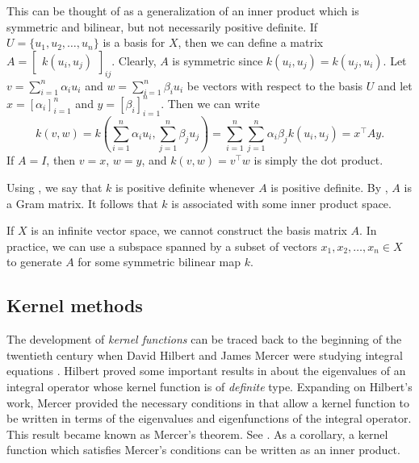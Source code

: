 This can be thought of as a generalization of an inner product which is symmetric and bilinear, but not necessarily positive definite.
If \(U = \{u_1, u_2, \dots, u_n\}\) is a basis for \(X\), then we can define a matrix \(A = \begin{bmatrix}
    k(u_i, u_j)
\end{bmatrix}_{ij}\).
Clearly, \(A\) is symmetric since \(k(u_i, u_j) = k(u_j, u_i)\).
Let \(v = \sum_{i=1}^n \alpha_i u_i\) and \(w = \sum_{i=1}^n \beta_i u_i\) be vectors with respect to the basis \(U\) and let \(x = [\alpha_i]_{i=1}^n\) and \(y = [\beta_i]_{i=1}^n\).
Then we can write
\begin{equation}
    \label{eqn:bilinear-form-representation}
    k(v,w)
    = k\left(\sum_{i=1}^n \alpha_i u_i, \sum_{j=1}^{n} \beta_j u_j\right)
    = \sum_{i=1}^n \sum_{j=1}^{n} \alpha_i \beta_j k\left(u_i, u_j\right)
    = x^\top A y.
\end{equation}
If \(A = I\), then \(v = x\), \(w = y\), and \(k(v,w) = v^\top w\) is simply the dot product.

Using , we say that \(k\) is positive definite whenever \(A\) is positive definite.
By , \(A\) is a Gram matrix.
It follows that \(k\) is associated with some inner product space.

If \(X\) is an infinite vector space, we cannot construct the basis matrix \(A\).
In practice, we can use a subspace spanned by a subset of vectors \(x_1, x_2, \dots, x_n \in X\) to generate \(A\) for some symmetric bilinear map \(k\).

\subsection{Kernel methods}

The development of \textit{kernel functions} can be traced back to the beginning of the twentieth century when David Hilbert and James Mercer were studying integral equations \cite{hofmann2008kernel}.
Hilbert proved some important results in \cite{hilbert1912grundzüge} about the eigenvalues of an integral operator whose kernel function is of \textit{definite} type.
Expanding on Hilbert's work, Mercer provided the necessary conditions in \cite{mercer1909xvi} that allow a kernel function to be written in terms of the eigenvalues and eigenfunctions of the integral operator.
This result became known as Mercer's theorem.
See .
As a corollary, a kernel function which satisfies Mercer's conditions can be written as an inner product.

